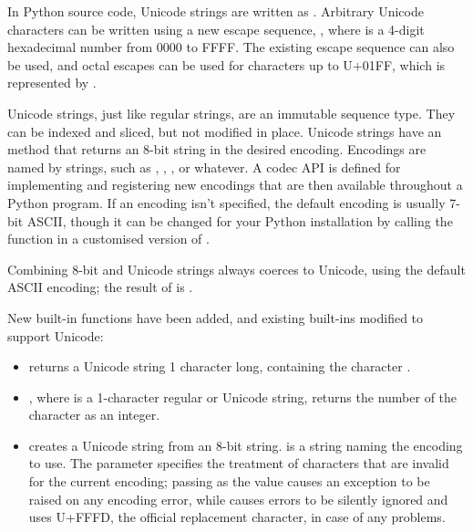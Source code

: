 \documentclass{howto}
\begin{document}
In Python source code, Unicode strings are written as
.  Arbitrary Unicode characters can be written using a
new escape sequence, , where  is a
4-digit hexadecimal number from 0000 to FFFF.  The existing
 escape sequence can also be used, and octal
escapes can be used for characters up to U+01FF, which is represented
by .

Unicode strings, just like regular strings, are an immutable sequence
type.  They can be indexed and sliced, but not modified in place.
Unicode strings have an  method
that returns an 8-bit string in the desired encoding.  Encodings are
named by strings, such as , ,
, or whatever.  A codec API is defined for
implementing and registering new encodings that are then available
throughout a Python program.  If an encoding isn't specified, the
default encoding is usually 7-bit ASCII, though it can be changed for
your Python installation by calling the
 function in a
customised version of .

Combining 8-bit and Unicode strings always coerces to Unicode, using
the default ASCII encoding; the result of  is
.

New built-in functions have been added, and existing built-ins
modified to support Unicode:

\begin{itemize}
\item {} returns a Unicode string 1 character
long, containing the character .

\item {}, where  is a 1-character regular or Unicode string, returns the number of the character as an integer.

\item {} creates a Unicode string from an 8-bit
string.   is a string naming the encoding to use.
The  parameter specifies the treatment of characters that
are invalid for the current encoding; passing  as the
value causes an exception to be raised on any encoding error, while
 causes errors to be silently ignored and
 uses U+FFFD, the official replacement character, in
case of any problems.

\end{itemize}
\end{document}
